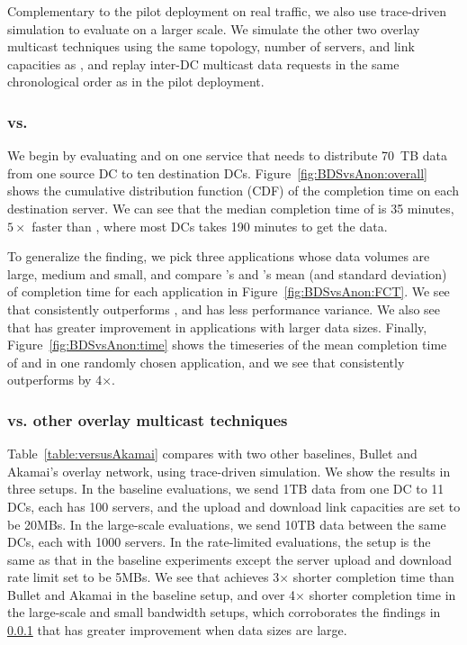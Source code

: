 Complementary to the pilot deployment on real traffic, we also use
trace-driven simulation to evaluate \name on a larger scale.
We simulate the other two overlay multicast techniques using the
same topology, number of servers, and link capacities as \name, and
replay inter-DC multicast data requests in the same chronological
order as in the pilot deployment.

\subsubsection{\name vs. \alg}
\label{subsubsec:name-vs-alg}

We begin by evaluating \name and \alg on one service that needs to
distribute 70~TB data from one source DC to ten destination DCs.
Figure~\ref{fig:BDSvsAnon:overall} shows the cumulative distribution
function (CDF) of the completion time on each destination server. We can
see that the median completion time of \name is 35 minutes,
$5\times$ faster than \alg, where most DCs takes 190 minutes to
get the data.

To generalize the finding, we pick three applications whose data
volumes are large, medium and small, and compare \name's and \alg's
mean (and standard deviation) of completion time for each application
in Figure~\ref{fig:BDSvsAnon:FCT}.
We see that \name consistently outperforms \alg, and has less
performance variance. We also see that \name has greater improvement
in applications with larger data sizes. Finally,
Figure~\ref{fig:BDSvsAnon:time} shows the timeseries of the mean
completion time of \name and \alg in one randomly chosen application,
and we see that \name consistently outperforms \alg by 4$\times$.

\subsubsection{\name vs. other overlay multicast techniques}

Table~\ref{table:versusAkamai} compares \name with two other
baselines, Bullet and Akamai's overlay network, using trace-driven
simulation. We show the results in three setups. In the baseline evaluations,
we send 1TB data from one DC to 11 DCs, each has 100 servers, and
the upload and download link capacities are set to be 20MBs. In the
large-scale evaluations, we send 10TB data between the same DCs, each with
1000 servers. In the rate-limited evaluations, the setup is the same as that in the baseline experiments
except the server upload and download rate limit set to be 5MBs.
We see that \name achieves 3$\times$ shorter completion time than
Bullet and Akamai in the baseline setup, and over 4$\times$ shorter
completion time in the large-scale and small bandwidth setups, which
corroborates the findings in \Section\ref{subsubsec:name-vs-alg} that
\name has greater improvement when data sizes are large.


